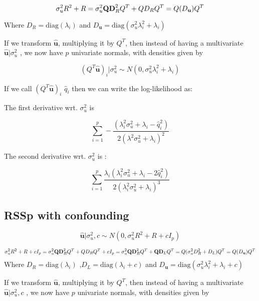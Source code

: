 $$\sigma^2_uR^2+R \\ = \sigma_u^2\textbf{Q}\textbf{D}_R^2Q^{T} + Q D_{R} Q^{T} \\ =Q(D_\textbf{u})Q^{T}$$

Where \(D_R=\text{diag}\left(\lambda_i\right)\) and \(D_\textbf{u}=\text{diag}\left(\sigma_u^2\lambda_i^2+\lambda_i\right)\)

If we transform \(\hat{\textbf{u}}\), multiplying it by \(Q^{T}\), then instead of having a multivariate  \(\hat{\textbf{u}}|\sigma_u^2\) , we now have \(p\) univariate normals, with densities given by 

$$(Q^{T}\hat{\textbf{u}})_i|\sigma_u^2  \sim N(0,\sigma_u^2\lambda_i^2+\lambda_i)$$

If we call \((Q^{T}\hat{\textbf{u}})_i\) \(\hat{q}_i\) then we can write the log-likelihood as:


The first derivative wrt. \(\sigma_u^2\) is

$$\sum_{i=1}^p -\frac{(\lambda_i^2 \sigma_u^2 + \lambda_i - \hat{q}_i^2)}{2 (\lambda^2 \sigma_u^2 + \lambda_i)^2}$$

The second derivative wrt. \(\sigma_u^2\) is :

$$\sum_{i=1}^p  \frac{\lambda_i (\lambda_i^2 \sigma_u^2 + \lambda_i - 2 \hat{q}_i^2)}{2 (\lambda_i^2 \sigma_u^2 + \lambda_i)^3}$$

\subsection{RSSp with confounding}\label{sec:org33ff459}


$$ \hat{\textbf{u}}|\sigma_u^2,c \sim N(0,\sigma_u^2R^2+R+cI_p)$$

$$\sigma^2_uR^2+R+cI_p \\ = \sigma_u^2\textbf{Q}\textbf{D}_R^2Q^{T} + Q D_{R} Q^{T} + cI_p \\ =\sigma_u^2\textbf{Q}\textbf{D}_R^2Q^{T}+\textbf{Q}\textbf{D}_LQ^{T} \\ =Q(\sigma_u^2D^2_R + D_L)Q^{T} \\ =Q(D_\textbf{u})Q^{T}$$
Where \(D_R=\text{diag}\left(\lambda_i\right)\) ,\(D_L=\text{diag}\left(\lambda_i+c\right)\) and \(D_\textbf{u}=\text{diag}\left(\sigma_u^2\lambda_i^2+\lambda_i+c\right)\)

If we transform \(\hat{\textbf{u}}\), multiplying it by \(Q^{T}\), then instead of having a multivariate  \(\hat{\textbf{u}}|\sigma_u^2,c\) , we now have \(p\) univariate normals, with densities given by 

